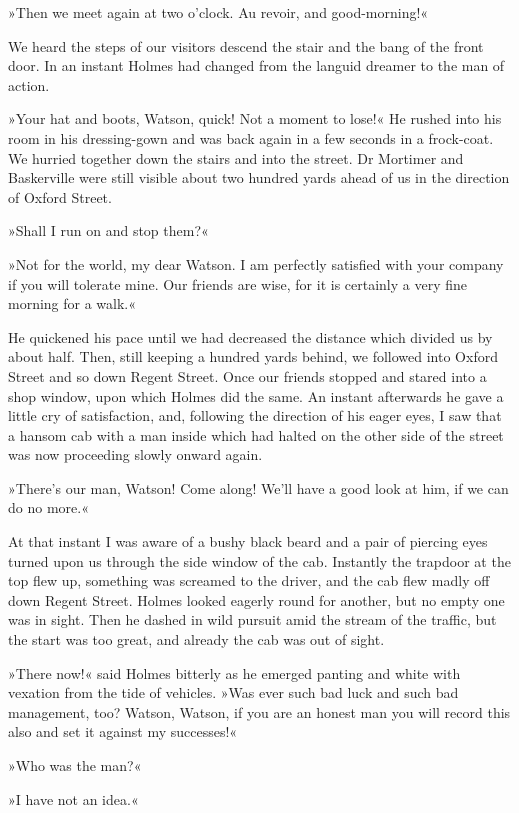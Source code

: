 »Then we meet again at two o'clock. Au revoir, and good-morning!«

We heard the steps of our visitors descend the stair and the bang of the front door. In an instant Holmes had changed from the languid dreamer to the man of action.

»Your hat and boots, Watson, quick! Not a moment to lose!« He rushed into his room in his dressing-gown and was back again in a few seconds in a frock-coat. We hurried together down the stairs and into the street. Dr Mortimer and Baskerville were still visible about two hundred yards ahead of us in the direction of Oxford Street.

»Shall I run on and stop them?«

»Not for the world, my dear Watson. I am perfectly satisfied with your company if you will tolerate mine. Our friends are wise, for it is certainly a very fine morning for a walk.«

He quickened his pace until we had decreased the distance which divided us by about half. Then, still keeping a hundred yards behind, we followed into Oxford Street and so down Regent Street. Once our friends stopped and stared into a shop window, upon which Holmes did the same. An instant afterwards he gave a little cry of satisfaction, and, following the direction of his eager eyes, I saw that a hansom cab with a man inside which had halted on the other side of the street was now proceeding slowly onward again.

»There's our man, Watson! Come along! We'll have a good look at him, if we can do no more.«

At that instant I was aware of a bushy black beard and a pair of piercing eyes turned upon us through the side window of the cab. Instantly the trapdoor at the top flew up, something was screamed to the driver, and the cab flew madly off down Regent Street. Holmes looked eagerly round for another, but no empty one was in sight. Then he dashed in wild pursuit amid the stream of the traffic, but the start was too great, and already the cab was out of sight.

»There now!« said Holmes bitterly as he emerged panting and white with vexation from the tide of vehicles. »Was ever such bad luck and such bad management, too? Watson, Watson, if you are an honest man you will record this also and set it against my successes!«

»Who was the man?«

»I have not an idea.«

